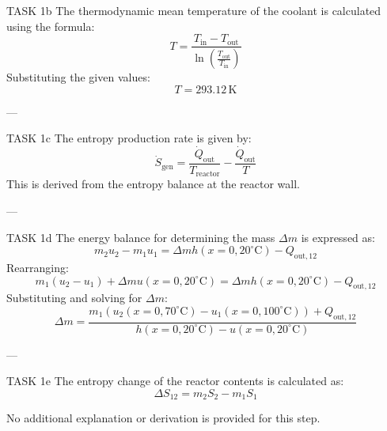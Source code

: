 TASK 1b  
The thermodynamic mean temperature of the coolant is calculated using the formula:  
\[
T = \frac{T_{\text{in}} - T_{\text{out}}}{\ln\left(\frac{T_{\text{out}}}{T_{\text{in}}}\right)}
\]  
Substituting the given values:  
\[
T = 293.12 \, \text{K}
\]  

---

TASK 1c  
The entropy production rate is given by:  
\[
\dot{S}_{\text{gen}} = \frac{\dot{Q}_{\text{out}}}{T_{\text{reactor}}} - \frac{\dot{Q}_{\text{out}}}{T}
\]  
This is derived from the entropy balance at the reactor wall.  

---

TASK 1d  
The energy balance for determining the mass \( \Delta m \) is expressed as:  
\[
m_2 u_2 - m_1 u_1 = \Delta m h(x=0, 20^\circ\text{C}) - Q_{\text{out},12}
\]  
Rearranging:  
\[
m_1 \left(u_2 - u_1\right) + \Delta m u(x=0, 20^\circ\text{C}) = \Delta m h(x=0, 20^\circ\text{C}) - Q_{\text{out},12}
\]  
Substituting and solving for \( \Delta m \):  
\[
\Delta m = \frac{m_1 \left(u_2(x=0, 70^\circ\text{C}) - u_1(x=0, 100^\circ\text{C})\right) + Q_{\text{out},12}}{h(x=0, 20^\circ\text{C}) - u(x=0, 20^\circ\text{C})}
\]  

---

TASK 1e  
The entropy change of the reactor contents is calculated as:  
\[
\Delta S_{12} = m_2 S_2 - m_1 S_1
\]  

No additional explanation or derivation is provided for this step.